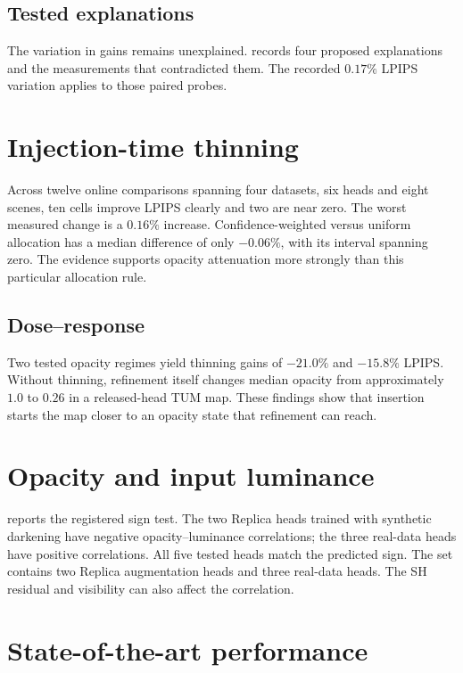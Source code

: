 \subsection{Tested explanations}
The variation in gains remains unexplained.  records
four proposed explanations and the measurements that contradicted them.
The recorded $0.17\%$ LPIPS variation applies to those paired probes.



\section{Injection-time thinning}
\label{sec:exp:thin}

Across twelve online comparisons spanning four datasets, six heads and
eight scenes, ten cells improve LPIPS clearly and two are near zero. The
worst measured change is a $0.16\%$ increase. Confidence-weighted versus
uniform allocation has a median difference of only $-0.06\%$, with its
interval spanning zero. The evidence supports opacity attenuation more
strongly than this particular allocation rule.



\subsection{Dose--response}
Two tested opacity regimes yield thinning gains of $-21.0\%$ and
$-15.8\%$ LPIPS. Without thinning, refinement itself changes median opacity
from approximately $1.0$ to $0.26$ in a released-head TUM map.
These findings show that insertion starts the map closer to an opacity state
that refinement can reach.

\section{Opacity and input luminance}
\label{sec:exp:mech}

 reports the registered sign test. The two Replica heads
trained with synthetic darkening have negative opacity--luminance
correlations; the three real-data heads have positive correlations.
All five tested heads match the predicted sign. The set contains two Replica
augmentation heads and three real-data heads. The SH residual and visibility
can also affect the correlation.



\section{State-of-the-art performance}
\label{sec:exp:replica}

